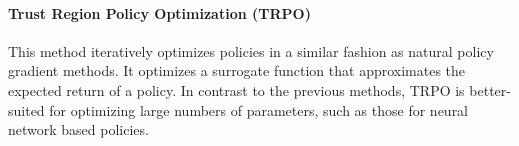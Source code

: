 \paragraph{Trust Region Policy Optimization (TRPO)~\cite{TRPO,
policyoptimizationNIPS2016}}
This method iteratively optimizes policies in a similar fashion as natural
policy gradient methods. It optimizes a surrogate function that approximates
the expected return of a policy.  In contrast to the previous methods, TRPO is
better-suited for optimizing large numbers of parameters, such as those for
neural network based policies.
